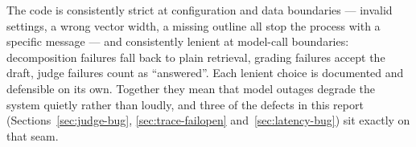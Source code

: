 \begin{keyidea}
The code is consistently strict at configuration and data boundaries --- invalid settings, a wrong vector width, a missing outline all stop the process with a specific message --- and consistently lenient at model-call boundaries: decomposition failures fall back to plain retrieval, grading failures accept the draft, judge failures count as \enquote{answered}. Each lenient choice is documented and defensible on its own. Together they mean that model outages degrade the system quietly rather than loudly, and three of the defects in this report (Sections~\ref{sec:judge-bug}, \ref{sec:trace-failopen} and~\ref{sec:latency-bug}) sit exactly on that seam.
\end{keyidea}
